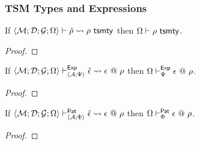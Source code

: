 \subsubsection{TSM Types and Expressions}
\begin{theorem}
\label{thm:tsm-type-expansion-P}
If $\langle \mathcal{M}; \mathcal{D}; \mathcal{G}; \Omega \rangle \vdash {\hat\rho} \leadsto \rho ~\mathsf{tsmty}$ then $\Omega \vdash \rho~\mathsf{tsmty}$.
\end{theorem}
\begin{proof}\end{proof}

\begin{theorem}
\label{thm:peTSM-expression-expansion}
If $\langle \mathcal{M}; \mathcal{D}; \mathcal{G}; \Omega \rangle \vdash_{\langle \mathcal{A}; \Psi \rangle}^{\mathsf{Exp}} {\hat\epsilon} \leadsto \epsilon~@~\rho$ then $\Omega \vdash_{\Psi}^{\mathsf{Exp}} \epsilon ~@~ \rho$.
\end{theorem}
\begin{proof}\end{proof}

\begin{theorem}
\label{thm:ppTSM-expression-expansion}
If $\langle \mathcal{M}; \mathcal{D}; \mathcal{G}; \Omega \rangle \vdash_{\langle \mathcal{A}; \Phi \rangle}^{\mathsf{Pat}} {\hat\epsilon} \leadsto \epsilon~@~\rho$ then $\Omega \vdash_{\Phi}^{\mathsf{Pat}} \epsilon ~@~ \rho$.
\end{theorem}
\begin{proof}\end{proof}

